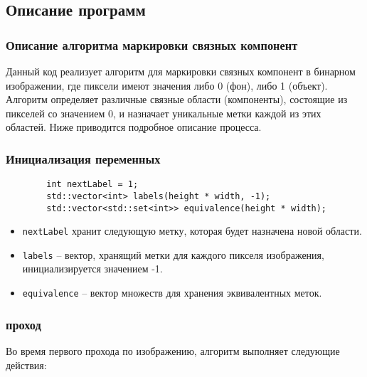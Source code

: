 \documentclass[a4paper, 14pt]{article}
\begin{document}
	\newpage
	\subsection*{\centering Описание программ}
        \subsubsection*{\centering Описание алгоритма маркировки связных компонент}

        Данный код реализует алгоритм для маркировки связных компонент в бинарном изображении, где пиксели имеют значения либо 0 (фон), либо 1 (объект). Алгоритм определяет различные связные области (компоненты), состоящие из пикселей со значением 0, и назначает уникальные метки каждой из этих областей. Ниже приводится подробное описание процесса.

        \subsubsection*{\centering Инициализация переменных}
        
        \begin{verbatim}
        int nextLabel = 1;
        std::vector<int> labels(height * width, -1);
        std::vector<std::set<int>> equivalence(height * width);
        \end{verbatim}
        
        \begin{itemize}
          \item \texttt{nextLabel} хранит следующую метку, которая будет назначена новой области.
          \item \texttt{labels} – вектор, хранящий метки для каждого пикселя изображения, инициализируется значением -1.
          \item \texttt{equivalence} – вектор множеств для хранения эквивалентных меток.
        \end{itemize}
        
        \subsubsection*{ проход}
        
        Во время первого прохода по изображению, алгоритм выполняет следующие действия:
        
\end{document}
